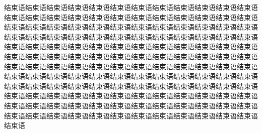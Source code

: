 % 




\par 结束语结束语结束语结束语结束语结束语结束语结束语结束语结束语结束语结束语结束语结束语结束语结束语结束语结束语结束语结束语结束语结束语结束语结束语结束语结束语结束语结束语结束语结束语结束语结束语结束语结束语结束语结束语结束语结束语结束语结束语结束语结束语结束语结束语结束语结束语结束语结束语结束语结束语结束语结束语结束语结束语结束语结束语结束语结束语结束语结束语结束语结束语结束语结束语结束语结束语结束语结束语结束语结束语结束语结束语结束语结束语结束语结束语结束语结束语结束语结束语结束语结束语结束语结束语结束语结束语结束语结束语结束语结束语结束语结束语结束语结束语结束语结束语结束语结束语结束语结束语结束语结束语结束语结束语结束语结束语结束语结束语结束语结束语结束语结束语结束语结束语结束语结束语结束语结束语结束语结束语结束语结束语结束语结束语结束语结束语结束语结束语结束语结束语结束语结束语结束语结束语结束语结束语结束语结束语结束语结束语结束语结束语结束语结束语结束语